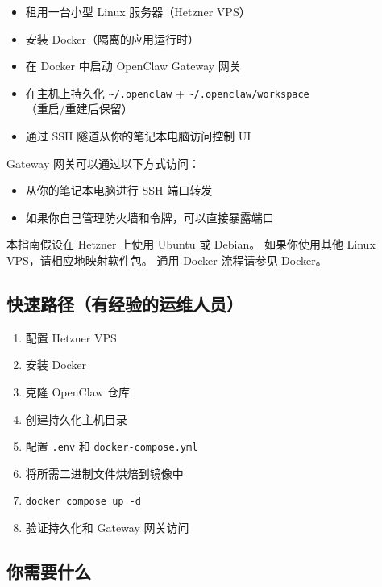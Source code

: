 \begin{itemize}
  \item 租用一台小型 Linux 服务器（Hetzner VPS）
  \item 安装 Docker（隔离的应用运行时）
  \item 在 Docker 中启动 OpenClaw Gateway 网关
  \item 在主机上持久化 \texttt{\textasciitilde{}/.openclaw} + \texttt{\textasciitilde{}/.openclaw/workspace}（重启/重建后保留）
  \item 通过 SSH 隧道从你的笔记本电脑访问控制 UI
\end{itemize}


Gateway 网关可以通过以下方式访问：

\begin{itemize}
  \item 从你的笔记本电脑进行 SSH 端口转发
  \item 如果你自己管理防火墙和令牌，可以直接暴露端口
\end{itemize}


本指南假设在 Hetzner 上使用 Ubuntu 或 Debian。
如果你使用其他 Linux VPS，请相应地映射软件包。
通用 Docker 流程请参见 \href{/install/docker}{Docker}。

\hrulefill


\subsection{快速路径（有经验的运维人员）}


\begin{enumerate}
  \item 配置 Hetzner VPS
  \item 安装 Docker
  \item 克隆 OpenClaw 仓库
  \item 创建持久化主机目录
  \item 配置 \texttt{.env} 和 \texttt{docker-compose.yml}
  \item 将所需二进制文件烘焙到镜像中
  \item \texttt{docker compose up -d}
  \item 验证持久化和 Gateway 网关访问
\end{enumerate}


\hrulefill


\subsection{你需要什么}



